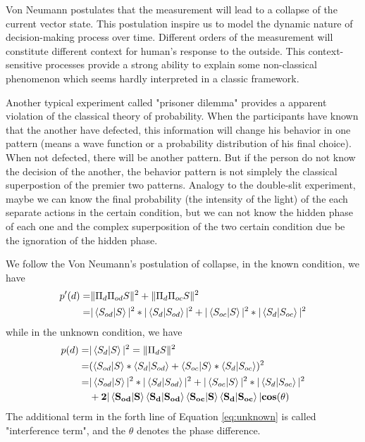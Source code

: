 \documentclass[11pt,notitlepage]{article}
\begin{document}
Von Neumann postulates that the measurement will lead to a collapse of the current vector state. This postulation inspire us to model the dynamic nature of decision-making process over time. Different orders of the measurement will constitute different context for human's response to the outside. This context-sensitive processes provide a strong ability to explain some non-classical phenomenon which seems hardly interpreted in a classic framework.

Another typical experiment called "prisoner dilemma" provides a apparent violation of the classical theory of probability. When the participants have known that the another have defected, this information will change his behavior in one pattern (means a wave function or a probability distribution of his final choice). When not defected, there will be another pattern. But if the person do not know the decision of the another, the behavior pattern is not simplely the classical superpostion of the premier two patterns. Analogy to the double-slit experiment, maybe we can know the final probability (the intensity of the light) of the each separate actions in the certain condition, but we can not know the hidden phase of each one and the complex superposition of the two certain condition due be the ignoration of the hidden phase.

We follow the Von Neumann's postulation of collapse, in the known condition, we have
\begin{equation}
\begin{split}
p'(d)=&\Vert\Pi_{d}\Pi_{od}S\Vert^2+\Vert\Pi_{d}\Pi_{oc}S\Vert^2 \\
=&\vert \braket{S_{od}|S}|^2*|\braket{S_d|S_{od}} \vert^2 +\vert \braket{S_{oc}|S}|^2*|\braket{S_d|S_{oc}} \vert^2
\end{split}
\label{eq:known}
\end{equation}
while in the unknown condition, we have
\begin{equation}
\begin{split}
p(d)=&\vert \braket{S_d|S}\vert ^2=\Vert\Pi_dS \Vert^2 \\
=&(\braket{S_{od}|S} *\braket{S_d|S_{od}} +\braket{S_{oc}|S}* \braket{S_d|S_{oc}})^2 \\
=&|\braket{S_{od}|S}|^2*|\braket{S_d|S_{od}}|^2  +|\braket{S_{oc}|S}|^2*|\braket{S_d|S_{oc}}|^2 \\
&+\mathbf{2\vert \braket{S_{od}|S} \braket{S_d|S_{od}} \braket{S_{oc}|S} \braket{S_d|S_{oc}} \vert cos(}\theta)
\end{split}
\label{eq:unknown}
\end{equation}
The additional term in the forth line of Equation \ref{eq:unknown} is called "interference term", and the $\theta$ denotes the phase difference.
\end{document}

